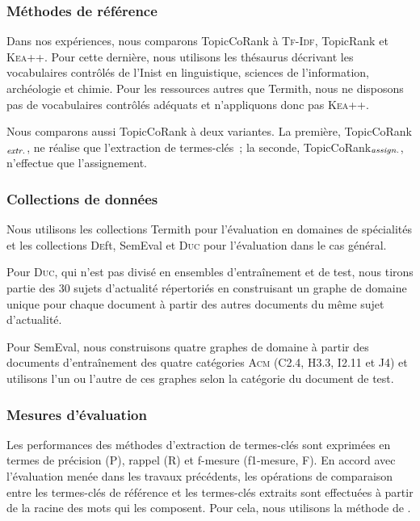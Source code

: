       \subsubsection{Méthodes de référence}
      \label{subsubsec:main-domain_specific_keyphrase_annotation-supervised_automatic_keyphrase_annotation-evaluation-baselines}
        Dans nos expériences, nous comparons TopicCoRank à \textsc{Tf-Idf},
        TopicRank et \textsc{Kea++}. Pour cette dernière, nous utilisons les
        thésaurus décrivant les vocabulaires contrôlés de l'Inist en
        linguistique, sciences de l'information, archéologie et chimie. Pour les
        ressources autres que Termith, nous ne disposons pas de vocabulaires
        contrôlés adéquats et n'appliquons donc pas \textsc{Kea++}.

        Nous comparons aussi TopicCoRank à deux variantes. La première,
        TopicCoRank$_\textnormal{\textit{extr.}}$, ne réalise que l'extraction
        de termes-clés~; la seconde,
        TopicCoRank$_\textnormal{\textit{assign.}}$, n'effectue que
        l'assignement.

      \subsubsection{Collections de données}
      \label{subsubsec:main-domain_specific_keyphrase_annotation-supervised_automatic_keyphrase_annotation-evaluation-evaluation_data}
        Nous utilisons les collections Termith pour l'évaluation en domaines de
        spécialités et les collections \textsc{De}ft, SemEval et \textsc{Duc}
        pour l'évaluation dans le cas général.
        
        Pour \textsc{Duc}, qui n'est pas divisé en ensembles d'entraînement et
        de test, nous tirons partie des 30 sujets d'actualité répertoriés en
        construisant un graphe \og{}de domaine\fg{} unique pour chaque document
        à partir des autres documents du même sujet d'actualité.
        
        Pour SemEval, nous construisons quatre graphes de domaine à partir des
        documents d'entraînement des quatre catégories \textsc{Acm} (C2.4, H3.3,
        I2.11 et J4) et utilisons l'un ou l'autre de ces graphes selon la
        catégorie du document de test. 
      
      \subsubsection{Mesures d'évaluation}
      \label{subsubsec:main-domain_specific_keyphrase_annotation-supervised_automatic_keyphrase_annotation-evaluation-evaluation_measures}
        Les performances des méthodes d'extraction de termes-clés sont exprimées
        en termes de précision (P), rappel (R) et f-mesure (f1-mesure, F). En
        accord avec l'évaluation menée dans les travaux précédents, les
        opérations de comparaison entre les termes-clés de référence et les
        termes-clés extraits sont effectuées à partir de la racine des mots qui
        les composent. Pour cela, nous utilisons la méthode de
        .

